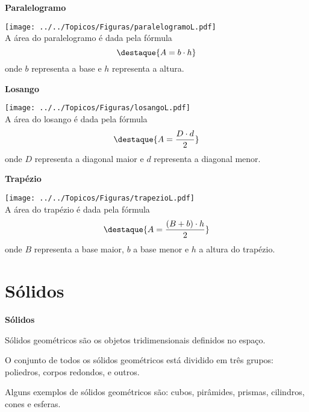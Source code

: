 \textbf{Paralelogramo}
\begin{multicols}{2}
\texttt{[image: ../../Topicos/Figuras/paralelogramoL.pdf]} \\
A área do paralelogramo é dada pela fórmula
\[\destaque{A= b \cdot h}\]
onde $b$ representa a base e $h$ representa a altura.
\end{multicols}

\newpage

\textbf{Losango}
\begin{multicols}{2}
\texttt{[image: ../../Topicos/Figuras/losangoL.pdf]} \\
A área do losango é dada pela fórmula
\[\destaque{A= \frac{D \cdot d}{2}}\]
onde $D$ representa a diagonal maior e $d$ representa a diagonal menor.
\end{multicols}

\textbf{Trapézio}
\begin{multicols}{2}
\texttt{[image: ../../Topicos/Figuras/trapezioL.pdf]} \\
A área do trapézio é dada pela fórmula
\[\destaque{A= \frac{(B+b)\cdot h}{2}}\]
onde $B$ representa a base maior, $b$ a base menor e $h$ a altura do trapézio.
\end{multicols}

\section{Sólidos}

\vskip0.3cm

\colorbox{azul}{
 \begin{minipage}{0.9\linewidth}
 \begin{center}
 \textbf{Sólidos}

  Sólidos geométricos são os objetos tridimensionais definidos no espaço.

  O conjunto de todos os sólidos geométricos está dividido em três grupos: poliedros, corpos redondos, e outros.

 \end{center}
 \end{minipage}}

 \vskip0.3cm

 Alguns exemplos de sólidos geométricos são: cubos, pirâmides, prismas, cilindros, cones e esferas.



\begin{figure}[H]
\center
{}
\qquad
{}
\end{figure}

